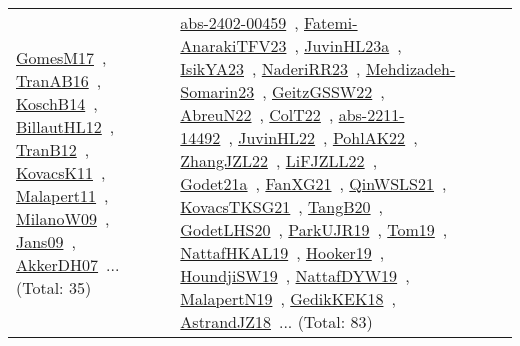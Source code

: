 {\begin{longtable}{lp{3cm}>{\raggedright\arraybackslash}p{6cm}>{\raggedright\arraybackslash}p{6cm}>{\raggedright\arraybackslash}p{8cm}}
\href{works/GomesM17.pdf}{GomesM17}~\cite{GomesM17}, \href{works/TranAB16.pdf}{TranAB16}~\cite{TranAB16}, \href{works/KoschB14.pdf}{KoschB14}~\cite{KoschB14}, \href{works/BillautHL12.pdf}{BillautHL12}~\cite{BillautHL12}, \href{works/TranB12.pdf}{TranB12}~\cite{TranB12}, \href{works/KovacsK11.pdf}{KovacsK11}~\cite{KovacsK11}, \href{works/Malapert11.pdf}{Malapert11}~\cite{Malapert11}, \href{works/MilanoW09.pdf}{MilanoW09}~\cite{MilanoW09}, \href{works/Jans09.pdf}{Jans09}~\cite{Jans09}, \href{works/AkkerDH07.pdf}{AkkerDH07}~\cite{AkkerDH07}... (Total: 35) & \href{works/abs-2402-00459.pdf}{abs-2402-00459}~\cite{abs-2402-00459}, \href{works/Fatemi-AnarakiTFV23.pdf}{Fatemi-AnarakiTFV23}~\cite{Fatemi-AnarakiTFV23}, \href{works/JuvinHL23a.pdf}{JuvinHL23a}~\cite{JuvinHL23a}, \href{works/IsikYA23.pdf}{IsikYA23}~\cite{IsikYA23}, \href{works/NaderiRR23.pdf}{NaderiRR23}~\cite{NaderiRR23}, \href{works/Mehdizadeh-Somarin23.pdf}{Mehdizadeh-Somarin23}~\cite{Mehdizadeh-Somarin23}, \href{works/GeitzGSSW22.pdf}{GeitzGSSW22}~\cite{GeitzGSSW22}, \href{works/AbreuN22.pdf}{AbreuN22}~\cite{AbreuN22}, \href{works/ColT22.pdf}{ColT22}~\cite{ColT22}, \href{works/abs-2211-14492.pdf}{abs-2211-14492}~\cite{abs-2211-14492}, \href{works/JuvinHL22.pdf}{JuvinHL22}~\cite{JuvinHL22}, \href{works/PohlAK22.pdf}{PohlAK22}~\cite{PohlAK22}, \href{works/ZhangJZL22.pdf}{ZhangJZL22}~\cite{ZhangJZL22}, \href{works/LiFJZLL22.pdf}{LiFJZLL22}~\cite{LiFJZLL22}, \href{works/Godet21a.pdf}{Godet21a}~\cite{Godet21a}, \href{works/FanXG21.pdf}{FanXG21}~\cite{FanXG21}, \href{works/QinWSLS21.pdf}{QinWSLS21}~\cite{QinWSLS21}, \href{works/KovacsTKSG21.pdf}{KovacsTKSG21}~\cite{KovacsTKSG21}, \href{works/TangB20.pdf}{TangB20}~\cite{TangB20}, \href{works/GodetLHS20.pdf}{GodetLHS20}~\cite{GodetLHS20}, \href{works/ParkUJR19.pdf}{ParkUJR19}~\cite{ParkUJR19}, \href{works/Tom19.pdf}{Tom19}~\cite{Tom19}, \href{works/NattafHKAL19.pdf}{NattafHKAL19}~\cite{NattafHKAL19}, \href{works/Hooker19.pdf}{Hooker19}~\cite{Hooker19}, \href{works/HoundjiSW19.pdf}{HoundjiSW19}~\cite{HoundjiSW19}, \href{works/NattafDYW19.pdf}{NattafDYW19}~\cite{NattafDYW19}, \href{works/MalapertN19.pdf}{MalapertN19}~\cite{MalapertN19}, \href{works/GedikKEK18.pdf}{GedikKEK18}~\cite{GedikKEK18}, \href{works/AstrandJZ18.pdf}{AstrandJZ18}~\cite{AstrandJZ18}... (Total: 83)\\
\end{longtable}
}

